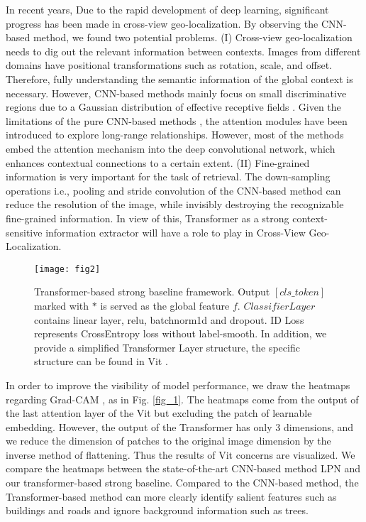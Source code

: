\documentclass[lettersize,journal]{IEEEtran}
\begin{document}
In recent years, Due to the rapid development of deep learning, significant progress has been made in cross-view geo-localization. By observing the CNN-based method, we found two potential problems. (I) Cross-view geo-localization needs to dig out the relevant information between contexts. Images from different domains have positional transformations such as rotation, scale, and offset. Therefore, fully understanding the semantic information of the global context is necessary. However, CNN-based methods mainly focus on small discriminative regions due to a Gaussian distribution of effective receptive fields \cite{ref12}. Given the limitations of the pure CNN-based methods \cite{ref13}, the attention modules have been introduced to explore long-range relationships\cite{ref14}. However, most of the methods embed the attention mechanism into the deep convolutional network, which enhances contextual connections to a certain extent. (II) Fine-grained information is very important for the task of retrieval. The down-sampling operations i.e., pooling and stride convolution of the CNN-based method can reduce the resolution of the image, while invisibly destroying the recognizable fine-grained information. In view of this, Transformer as a strong context-sensitive information extractor will have a role to play in Cross-View Geo-Localization.

\begin{figure*}[!t]
\centering
\texttt{[image: fig2]}
\caption{Transformer-based strong baseline framework. Output $[cls\_token]$ marked with $*$ is served as the global feature $f$. $Classifier Layer$ contains linear layer, relu, batchnorm1d and dropout. ID Loss represents CrossEntropy loss without label-smooth. In addition, we provide a simplified Transformer Layer structure, the specific structure can be found in Vit \cite{ref15}.}
\label{fig_2}
\end{figure*}

In order to improve the visibility of model performance, we draw the heatmaps regarding Grad-CAM \cite{ref16}, as in Fig. \ref{fig_1}. The heatmaps come from the output of the last attention layer of the Vit but excluding the patch of learnable embedding. However, the output of the Transformer has only 3 dimensions, and we reduce the dimension of patches to the original image dimension by the inverse method of flattening. Thus the results of Vit concerns are visualized. We compare the heatmaps between the state-of-the-art CNN-based method LPN \cite{ref11} and our transformer-based strong baseline. Compared to the CNN-based method, the Transformer-based method can more clearly identify salient features such as buildings and roads and ignore background information such as trees.  
\end{document}
